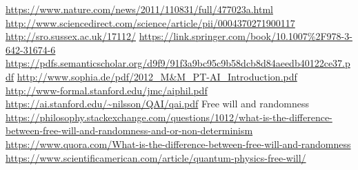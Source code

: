 \documentclass[a4paper]{article}
\begin{document}
\begin{thebibliography}{20}
 \url{https://www.nature.com/news/2011/110831/full/477023a.html}
 \url{http://www.sciencedirect.com/science/article/pii/0004370271900117}
 \url{http://sro.sussex.ac.uk/17112/}
 \url{https://link.springer.com/book/10.1007\%2F978-3-642-31674-6}
 \url{https://pdfs.semanticscholar.org/d9f9/91f3a9bc95c9b58dcb8d84aeedb40122ce37.pdf}
 \url{http://www.sophia.de/pdf/2012_M&M_PT-AI_Introduction.pdf}
 \url{http://www-formal.stanford.edu/jmc/aiphil.pdf}
 \url{https://ai.stanford.edu/~nilsson/QAI/qai.pdf}
 Free will and randomness \url{https://philosophy.stackexchange.com/questions/1012/what-is-the-difference-between-free-will-and-randomness-and-or-non-determinism} \url{https://www.quora.com/What-is-the-difference-between-free-will-and-randomness} \url{https://www.scientificamerican.com/article/quantum-physics-free-will/}
\end{thebibliography}
\end{document}
